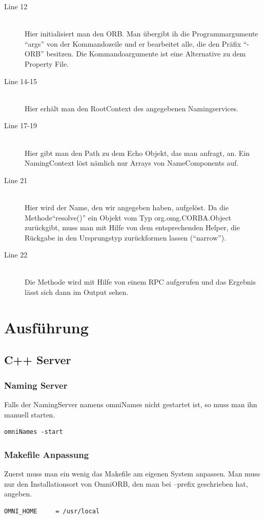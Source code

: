 \documentclass[11pt]{article}
\begin{document}
\begin{description}
\item[Line 12] \hfill \\
Hier initialisiert man den ORB. Man übergibt ih die Programmargumente ``args'' von der Kommandozeile und er bearbeitet alle, die den Präfix ``-ORB'' besitzen. Die Kommandoargumente ist eine Alternative zu dem Property File.

\item[Line 14-15] \hfill \\
Hier erhält man den RootContext des angegebenen Namingservices. 

\item[Line 17-19] \hfill \\
Hier gibt man den Path zu dem Echo Objekt, das man anfragt, an. Ein NamingContext löst nämlich nur Arrays von NameComponents auf. 

\item[Line 21] \hfill \\
Hier wird der Name, den wir angegeben haben, aufgelöst. Da die Methode``resolve()'' ein Objekt vom Typ org.omg.CORBA.Object zurückgibt, muss man mit Hilfe von dem entsprechenden Helper, die Rückgabe in den Ursprungstyp zurückformen lassen (``narrow'').

\item[Line 22] \hfill \\
Die Methode wird mit Hilfe von einem RPC aufgerufen und das Ergebnis lässt sich dann im Output sehen.

\end{description}

\section{Ausführung}
\subsection{C++ Server}
\subsubsection{Naming Server}
Falls der NamingServer namens omniNames nicht gestartet ist, so muss man ihn manuell starten.
\begin{lstlisting}
omniNames -start
\end{lstlisting}

\subsubsection{Makefile Anpassung}
Zuerst muss man ein wenig das Makefile am eigenen System anpassen. Man muss nur den Installationsort von OmniORB, den man bei --prefix geschrieben hat, angeben.
\begin{lstlisting}
OMNI_HOME     = /usr/local
\end{lstlisting}
\end{document}
